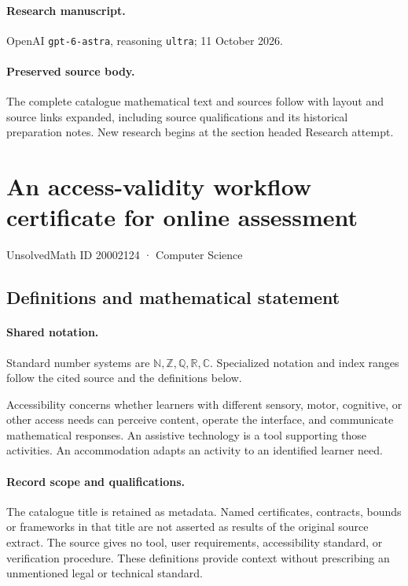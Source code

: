 \documentclass[11pt]{article}
\begin{document}
\paragraph{Research manuscript.} OpenAI \texttt{gpt-6-astra}, reasoning \texttt{ultra}; 11 October 2026.
\paragraph{Preserved source body.} The complete catalogue mathematical text and sources follow with layout and source links expanded, including source qualifications and its historical preparation notes. New research begins at the section headed Research attempt.

\section{An access-validity workflow certificate for online assessment}\label{20002124}
{\small UnsolvedMath ID 20002124 · Computer Science}
\subsection{Definitions and mathematical statement}

\paragraph{Shared notation.}Standard number systems are $\mathbb N,\mathbb Z,\mathbb Q,\mathbb R,\mathbb C$. Specialized notation and index ranges follow the cited source and the definitions below.


Accessibility concerns whether learners with different sensory, motor, cognitive, or other access needs can perceive content, operate the interface, and communicate mathematical responses. An assistive technology is a tool supporting those activities. An accommodation adapts an activity to an identified learner need.
\paragraph{Record scope and qualifications.}
The catalogue title is retained as metadata. Named certificates, contracts, bounds or frameworks in that title are not asserted as results of the original source extract.
The source gives no tool, user requirements, accessibility standard, or verification procedure. These definitions provide context without prescribing an unmentioned legal or technical standard.
\end{document}
